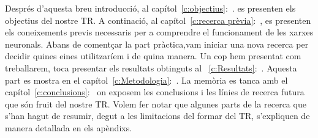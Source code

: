 Després d'aquesta breu introducció, al capítol~\ref{c:objectius}:~. es presenten els objectius del nostre TR. A continació, al capítol~\ref{c:recerca prèvia}:~, es presenten els coneixements previs necessaris per a comprendre el funcionament de les xarxes neuronals.
Abans de comentçar la part pràctica,vam iniciar una nova recerca per decidir quines eines utilitzaríem i de quina manera.
Un cop hem presentat com treballarem, toca presentar els resultats obtinguts al ~\ref{c:Resultats}:~. Aquesta part es mostra en el capítol~\ref{c:Metodologia}:~.
La memòria es tanca amb el capítol~\ref{c:conclusions}:~ on exposem les conclusions i les línies de recerca futura que són fruit del nostre TR.
Volem fer notar que algunes parts de la recerca que s'han hagut de resumir, degut a les limitacions del formar del TR, s'expliquen de manera detallada en els apèndixs.



